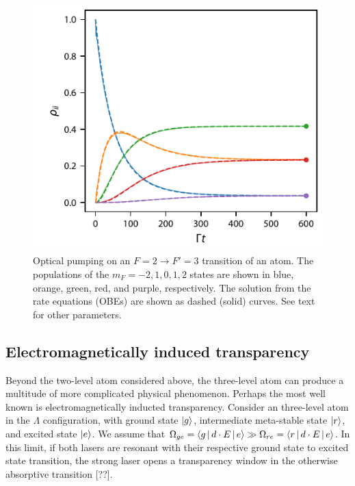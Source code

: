 \documentclass[final,5p,times,twocolumn]{elsarticle}
\begin{document}
\begin{figure}
	\center
	\includegraphics{figs/optical_pumping_f2_f3.pdf}
	\caption{\label{fig:optical_pumping} Optical pumping on an $F=2\rightarrow F'=3$ transition of an atom.  The populations of the $m_F=-2, 1, 0, 1, 2$ states are shown in blue, orange, green, red, and purple, respectively.  The solution from the rate equations (OBEs) are shown as dashed (solid) curves.  See text for other parameters.}
\end{figure}

\subsection{Electromagnetically induced transparency}
Beyond the two-level atom considered above, the three-level atom can produce a multitude of more complicated physical phenomenon.  Perhaps the most well known is electromagnetically inducted transparency.   Consider an three-level atom in the $\Lambda$ configuration, with ground state $\ket{g}$, intermediate meta-stable state $\ket{r}$, and excited state $\ket{e}$.  We assume that $\Omega_{ge} = \Braket{g|d\cdot E|e} \gg \Omega_{re} = \Braket{r|d\cdot E|e}$.   In this limit, if both lasers are resonant with their respective ground state  to excited state transition, the strong laser opens a transparency window in the otherwise absorptive transition [??].
\end{document}
